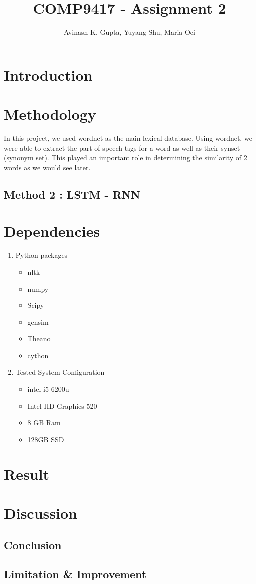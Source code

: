 \documentclass[11pt, oneside]{article}   	%
\title{COMP9417 - Assignment 2}
\author{Avinash K. Gupta, Yuyang Shu, Maria Oei}
\begin{document}
\maketitle
\newpage
\tableofcontents
\newpage
\section{Introduction}



\section{Methodology}
In this project, we used wordnet as the main lexical database. Using wordnet, we were able to extract the part-of-speech tags for a word as well as their synset (synonym set). This played an important role in determining the similarity of 2 words as we would see later.





\subsection{Method 2 : LSTM - RNN}
%



\section{Dependencies}

\begin{enumerate}
\item   Python packages

\begin{itemize}
\item nltk
\item numpy
\item Scipy
\item gensim
\item Theano
\item cython
\end{itemize}
\item Tested System Configuration
\begin{itemize}

\item intel i5 6200u
\item Intel HD Graphics 520
\item 8 GB Ram
\item 128GB SSD

\end{itemize}

\end{enumerate}

\section{Result}
%


\section{Discussion}
\subsection{Conclusion}
 \subsection{Limitation \& Improvement}
\end{document}
